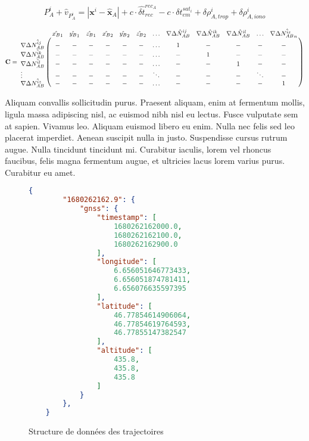 \begin{equation}
    \boxed{
    P^{i}_{A} + {\hat{v}}_{P^{i}_{A}} = |\textbf{x}^i - {\hat{\textbf{x}}}_A| + c \cdot \hat{\delta t}^{rec_A}_{rec} - c \cdot {\delta t}^{sat_i}_{em} + \delta \rho^{i}_{A,trop} + \delta \rho^{i}_{A,iono}
    }
    \label{eq_obs_pseudodistance}
\end{equation}

\begin{equation}
    \mathbf{C} =
    \bordermatrix{
        & \hat{x_B}_1 & \hat{y_B}_1 & \hat{z_B}_1 & \hat{x_B}_2 & \hat{y_B}_2 & \hat{z_B}_2 & \ldots & \nabla \Delta \hat{N}^{ij}_{AB} & \nabla \Delta \hat{N}^{ik}_{AB} & \nabla \Delta \hat{N}^{il}_{AB} & \ldots & \nabla \Delta \hat{N^{iz}_{AB}}_n\cr
        \nabla \Delta \hat{N^{ij}_{AB}} & - & - & - & - & - & - & \ldots & 1 & - & - & - & -\cr
        \nabla \Delta \hat{N^{ik}_{AB}} & - & - & - & - & - & - & \ldots & - & 1 & - & - & -\cr
        \nabla \Delta \hat{N^{il}_{AB}} & - & - & - & - & - & - & \ldots & - & - & 1 & - & -\cr
        \vdots & - & - & - & - & - & - & \ddots & - & - & - & \ddots & - \cr
        \nabla \Delta \hat{N^{iz}_{AB}} & - & - & - & - & - & - & \ldots & - & - & - & - & 1\cr
    }
\end{equation}

Aliquam convallis sollicitudin purus. Praesent aliquam, enim at fermentum mollis, ligula massa adipiscing nisl, ac euismod nibh nisl eu lectus. Fusce vulputate sem at sapien. Vivamus leo. Aliquam euismod libero eu enim. Nulla nec felis sed leo placerat imperdiet. Aenean suscipit nulla in justo. Suspendisse cursus rutrum augue. Nulla tincidunt tincidunt mi. Curabitur iaculis, lorem vel rhoncus faucibus, felis magna fermentum augue, et ultricies lacus lorem varius purus. Curabitur eu amet.

\begin{figure}[ht]
    \begin{lstlisting}[language=Json]
    {
        "1680262162.9": {
            "gnss": {
                "timestamp": [
                    1680262162000.0,
                    1680262162100.0, 
                    1680262162900.0
                ],
                "longitude": [
                    6.656051646773433,
                    6.656051874781411,
                    6.656076635597395
                ],
                "latitude": [
                    46.77854614906064,
                    46.77854619764593,
                    46.77855147382547
                ],
                "altitude": [
                    435.8,
                    435.8,
                    435.8
                ]
            }
        },
    }
    \end{lstlisting}
    \caption{Structure de données des trajectoires}\label{fig:fichier_Json}
\end{figure}

